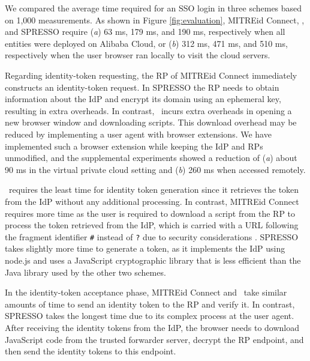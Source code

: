We compared the average time required for an SSO login in three schemes based on 1,000 measurements. As shown in Figure \ref{fig:evaluation},
MITREid Connect, \usso, and SPRESSO require (\emph{a}) 63 ms, 179 ms, and 190 ms, respectively when all entities were deployed on Alibaba Cloud,
 or (\emph{b}) 312 ms, 471 ms, and 510 ms, respectively when the user browser ran locally to visit the cloud servers.

Regarding identity-token requesting, %
the RP of MITREid Connect immediately constructs an identity-token request. %
In SPRESSO the RP needs to obtain information about the IdP %
and encrypt its domain using an ephemeral key, resulting in extra overheads.
In contrast, \usso\ incurs extra overheads in opening a new browser window and downloading scripts. This download overhead may be reduced %
by implementing a user agent with browser extensions.
We have implemented such a browser extension while keeping the IdP and RPs unmodified, and the supplemental experiments showed a reduction of (\emph{a}) about 90 ms in the virtual private cloud setting and (\emph{b}) 260 ms when accessed remotely.

\usso\ requires the least time for identity token generation since it retrieves the token from the IdP without any additional processing.
In contrast,
MITREid Connect requires more time as the user is required to download a script from the RP to process the token retrieved from the IdP, which is carried with a URL following the fragment identifier \verb+#+ instead of \verb+?+ due to security considerations \cite{de2014oauth}.
SPRESSO takes slightly more time to generate a token, as it implements the IdP using node.js and uses a JavaScript cryptographic library that is less efficient than the Java library used by the other two schemes.


In the identity-token acceptance phase, MITREid Connect and \usso\ take similar amounts of time to send an identity token to the RP and verify it.
In contrast, SPRESSO takes the longest time due to its complex process at the user agent.
After receiving the identity tokens from the IdP, the browser needs to download JavaScript code from the trusted forwarder server, decrypt the RP endpoint, and then send the identity tokens to this endpoint.

